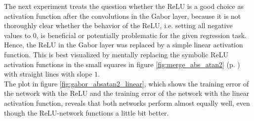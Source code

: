 \documentclass[11pt, a4paper]{article}
\newcommand\myref[1]{\ref{#1} (p. \pageref{#1})}
\begin{document}
The next experiment treats the question whether the \ac{ReLU} is a good choice as activation function after the convolutions in the Gabor layer, because it is not thoroughly clear whether the behavior of the \ac{ReLU}, i.e. setting all negative values to $0$, is beneficial or potentially problematic for the given regression task. Hence, the \ac{ReLU} in the Gabor layer was replaced by a simple linear activation function. This is best visualized by mentally replacing the symbolic \ac{ReLU} activation functions in the small squares in figure \myref{fig:merge_abs_atan2} with straight lines with slope $1$.\\
The plot in figure \ref{fig:gabor_absatan2_linear}, which shows the training error of the network with the \ac{ReLU} and the training error of the network with the linear activation function, reveals that both networks perform almost equally well, even though the \ac{ReLU}-network functions a little bit better.
\end{document}
